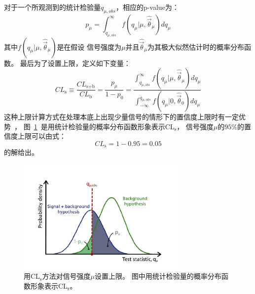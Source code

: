 对于一个所观测到的统计检验量$q_{\mu,obs}$，相应的p-value为：
\begin{equation} 
\label{eq:Limit5}
p_{\mu}=\int^{\infty}_{q_{\mu,obs}} f\left(   q_{\mu}|\mu, \hat{\vec{\theta}}_{\mu}   \right) dq_{\mu}
\end{equation}
其中$ f\left(   q_{\mu}|\mu, \hat{\vec{\theta}}_{\mu}   \right) $是在假设
信号强度为$\mu$并且$\hat{\vec{\theta}}_{\mu}$为其极大似然估计时的概率分布函数。
最后为了设置上限，定义如下变量：
\begin{equation} 
\label{eq:Limit6}
CL_\text{s}	\equiv \frac{CL_\text{s+b}}{CL_\text{b}}=\frac{p_{\mu}}{1-p_0}=
\frac{\int^{\infty}_{q_{\mu,obs}} f\left(   q_{\mu}|\mu, \hat{\vec{\theta}}_{\mu}   \right) dq_{\mu}}
{\int_{-\infty}^{q_{\mu,obs}} f\left(   q_{\mu}|0, \hat{\vec{\theta}}_0  \right) dq_{\mu}}
\end{equation}
这种上限计算方式在处理本底上出现少量信号的情形下的置信度上限时有一定优势~\cite{Read:2002hq}，
图~\ref{fig:CLs}~是用统计检验量的概率分布函数形象表示CL$_\text{s}$，
信号强度$\mu$的$95\%$的置信度上限可以由式：
\begin{equation} 
\label{eq:Limit7}
CL_\text{s}=1-0.95=0.05
\end{equation}
的解给出。

\begin{figure}[!ht]
        \centering
                \includegraphics[width=0.75\textwidth]{figuresDijet/10-LimitSettingResults/CLs.jpg}
        \caption{用CL$_\text{s}$方法对信号强度$\mu$设置上限。
        图中用统计检验量的概率分布函数形象表示CL$_\text{s}$。
        }
        \label{fig:CLs}
\end{figure}



